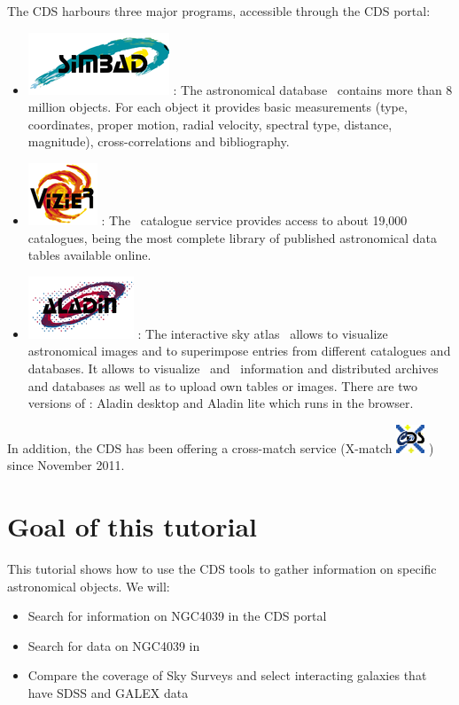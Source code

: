 \documentclass [a4paper, 12pt]{article}
\begin{document}
The CDS harbours three major programs, accessible through the CDS portal:\\
\begin{itemize}
\item \includegraphics[width=0.1 \textwidth]{../images/logo_simbad.png}
\textbf{\simbad}: The astronomical database \simbad\ contains more than
8 million objects. For each object it provides basic measurements (type,
coordinates, proper motion, radial velocity, spectral type, distance,
magnitude), cross-correlations and bibliography.
\item \includegraphics[width=0.08  \textwidth]{../images/logo_vizier.png}
\textbf{\vizier}: The \vizier\ catalogue service provides access to about
19,000 catalogues, being the most complete library of published astronomical
data tables available online.
\item \includegraphics[width=0.1  \textwidth]{../images/logo_aladin.png}
\textbf{\aladin}: The interactive sky atlas \aladin\ allows to
visualize astronomical images and to superimpose entries from different
catalogues and databases. It allows to visualize \simbad\ and \vizier\
information and distributed archives and databases as well as to upload own
tables or images. There are two versions of \aladin: Aladin desktop and Aladin
lite which runs in the browser.
\end{itemize}

In addition, the CDS has been offering a cross-match service
(X-match \includegraphics[width=0.03
\textwidth]{../images/logo_cds_xmatch.png} ) since November 2011.

\section{Goal of this tutorial}

This tutorial shows how to use the CDS tools to gather information on
specific astronomical objects. We will:
\begin{itemize}
\item Search for information on NGC4039 in the CDS portal
\item Search for data on NGC4039 in \aladin\
\item Compare the coverage of Sky Surveys and select interacting
galaxies that have SDSS and GALEX data
\end{itemize}
\end{document}
